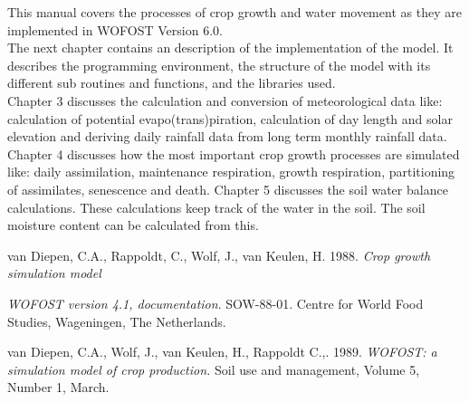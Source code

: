 This manual covers the processes of crop growth and water movement as they are
implement\-ed in WOFOST Version 6.0. \\
The next chapter contains an description of the implementation of the model. It
describes the programming environment, the structure of the model with its different
sub routines and functions, and the libraries used.\\
Chapter 3 discusses the calculation and conversion of meteorological data like:
calculation of potential evapo(trans)piration, calculation of day length and solar
elevation and deriving daily rainfall data from long term monthly rainfall data.\\
Chapter 4 discusses how the most important crop growth processes are simulated
like: daily assimilation, maintenance respiration, growth respiration, partitioning of
assimilates, senes\-cence and death. Chapter 5 discusses the soil water balance
calculations. These calculations keep track of the water in the soil. The soil moisture
content can be calculated from this. 

van Diepen, C.A., Rappoldt, C., Wolf, J., van Keulen, H. 1988. {\it Crop growth simula\-tion model \/}

{\it WOFOST version 4.1, documentation\/}. SOW-88-01. Centre for World
Food Studies, Wage\-ningen, The Netherlands.

van Diepen, C.A., Wolf, J., van Keulen, H., Rappoldt C.,. 1989. {\it WOFOST: a simula\-tion 
model of crop production. \/}Soil use and management, Volume 5, Number 1, March.
